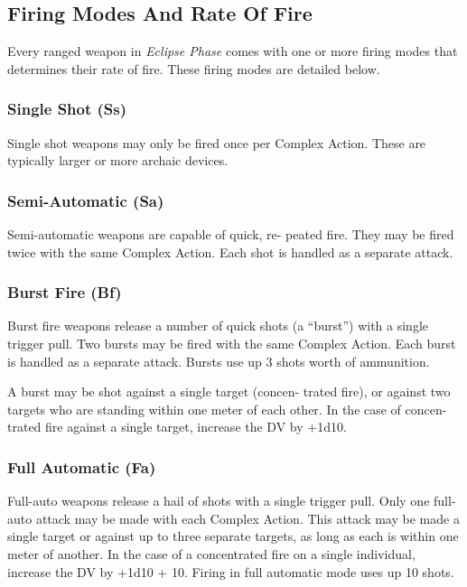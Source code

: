 \subsection{Firing Modes And Rate Of Fire}

Every ranged weapon in \textit{Eclipse Phase} comes with one 
or more firing modes that determines their rate of fire. 
These firing modes are detailed below.

\subsubsection{Single Shot (Ss)}

Single shot weapons may only be fired once per 
Complex Action. These are typically larger or more 
archaic devices.

\subsubsection{Semi-Automatic (Sa)}

Semi-automatic weapons are capable of quick, re-
peated fire. They may be fired twice with the same 
Complex Action. Each shot is handled as a separate 
attack.

\subsubsection{Burst Fire (Bf)}

Burst fire weapons release a number of quick shots 
(a ``burst'') with a single trigger pull. Two bursts may 
be fired with the same Complex Action. Each burst 
is handled as a separate attack. Bursts use up 3 shots 
worth of ammunition.

A burst may be shot against a single target (concen-
trated fire), or against two targets who are standing 
within one meter of each other. In the case of concen-
trated fire against a single target, increase the DV by 
+1d10.

\subsubsection{Full Automatic (Fa)}

Full-auto weapons release a hail of shots with a single 
trigger pull. Only one full-auto attack may be made 
with each Complex Action. This attack may be made a 
single target or against up to three separate targets, as 
long as each is within one meter of another. In the case 
of a concentrated fire on a single individual, increase 
the DV by +1d10 + 10. Firing in full automatic mode 
uses up 10 shots.

